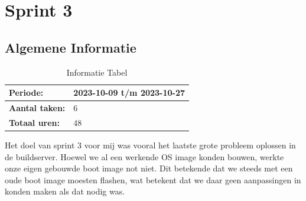 \documentclass[a4paper]{report}
\begin{document}
\chapter{Sprint 3}
\section{Algemene Informatie}
\begin{table}[H]
  \begin{tabularx}{0.6\textwidth}{|X|X|}
    \hline
    \cellcolor[HTML]{99ccff} \textbf{Periode:} & 2023-10-09 t/m 2023-10-27 \\ 
    \hline
    \cellcolor[HTML]{99ccff} \textbf{Aantal taken:} & 6 \\ 
    \hline
    \cellcolor[HTML]{99ccff} \textbf{Totaal uren:} & 48 \\ 
    \hline
  \end{tabularx}
  \caption{Informatie Tabel}
  \label{table:it3:general}
  \end{table}

  Het doel van sprint 3 voor mij was vooral het laatste grote probleem oplossen in de buildserver.
  Hoewel we al een werkende OS image konden bouwen, werkte onze eigen gebouwde boot image not niet.
  Dit betekende dat we steeds met een oude boot image moesten flashen, wat betekent dat we daar geen aanpassingen in konden maken als dat nodig was.
   
\end{document}
